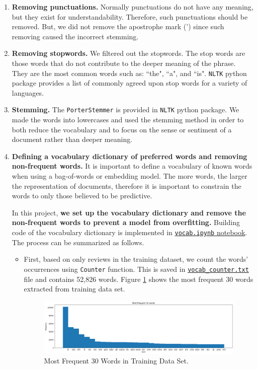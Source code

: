 \documentclass[11pt]{article}
\begin{document}
\begin{enumerate}
	\item \textbf{Removing punctuations.} 
Normally punctuations do not have any meaning, but they exist for understandability. Therefore, such punctuations should be removed. But, we did not remove the apostrophe mark (') since such removing caused the incorrect stemming.

\item \textbf{Removing stopwords.}
We filtered out the stopwords.
The stop words are those words that do not contribute to the deeper meaning of the phrase.
They are the most common words such as: ``the", ``a", and ``is".
\texttt{NLTK} python package provides a list of commonly agreed upon stop words for a variety of languages.

\item \textbf{Stemming.}  
The \texttt{PorterStemmer} is provided in \texttt{NLTK} python package.
We made the words into lowercases and used the stemming method in order to both reduce the vocabulary and to focus on the sense or sentiment of a document rather than deeper meaning.

\item \textbf{Defining a vocabulary dictionary of preferred words and removing non-frequent words.}   
It is important to define a vocabulary of known words when using a bag-of-words or embedding model.
The more words, the larger the representation of documents, therefore it is important to constrain the words to only those believed to be predictive. 

In this project, \textbf{we set up the vocabulary dictionary and remove the non-frequent words to prevent a model from overfitting.} 
Building code of the vocabulary dictionary is implemented in \href{https://github.com/ahrimhan/data-science-project/blob/master/project2/vocab.ipynb}{\texttt{vocab.ipynb} notebook}. 
The process can be summarized as follows.

\begin{itemize}
\item First, based on only reviews in the training dataset, we count the words' occurrences using \texttt{Counter} function. This is saved in 
\href{https://github.com/ahrimhan/data-science-project/tree/master/project2/vocab/vocab
_counter.txt}{\texttt{vocab\_counter.txt}} file and contains 52,826 words.
%
Figure \ref{fig:most_frequent_words} shows the most frequent 30 words extracted from training data set.
\begin{figure}[h!]
\centering 
\includegraphics[width=\textwidth]{most_frequent_words.png}
\caption{Most Frequent 30 Words in Training Data Set.}
  \label{fig:most_frequent_words}
\end{figure}


\end{itemize}
\end{enumerate}
\end{document}
